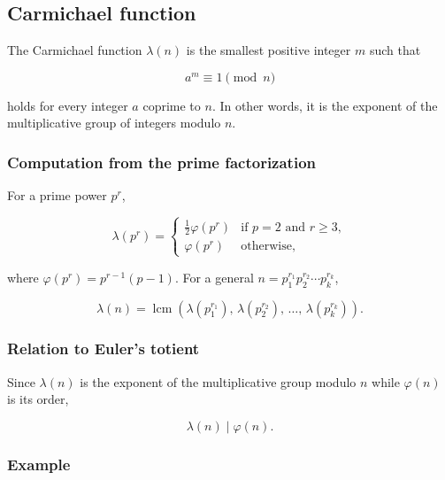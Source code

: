 \subsection{Carmichael function}

The Carmichael function $\lambda(n)$ is the smallest positive integer $m$ such that

\begin{equation}
    a^{m} \equiv 1 \pmod{n}
\end{equation}

holds for every integer $a$ coprime to $n$. In other words, it is the exponent of the
multiplicative group of integers modulo $n$.

\subsubsection{Computation from the prime factorization}

For a prime power $p^{r}$,

\begin{equation}
    \lambda(p^{r}) =
    \begin{cases}
        \tfrac{1}{2}\varphi(p^{r}) & \text{if } p = 2 \text{ and } r \geq 3, \\
        \varphi(p^{r})             & \text{otherwise,}
    \end{cases}
\end{equation}

where $\varphi(p^{r}) = p^{r-1}(p-1)$. For a general $n = p_1^{r_1} p_2^{r_2} \cdots p_k^{r_k}$,

\begin{equation}
    \lambda(n) = \operatorname{lcm}\left( \lambda(p_1^{r_1}),\, \lambda(p_2^{r_2}),\, \ldots,\, \lambda(p_k^{r_k}) \right).
\end{equation}

\subsubsection{Relation to Euler's totient}

Since $\lambda(n)$ is the exponent of the multiplicative group modulo $n$ while
$\varphi(n)$ is its order,

\begin{equation}
    \lambda(n) \mid \varphi(n).
\end{equation}

\subsubsection{Example}


